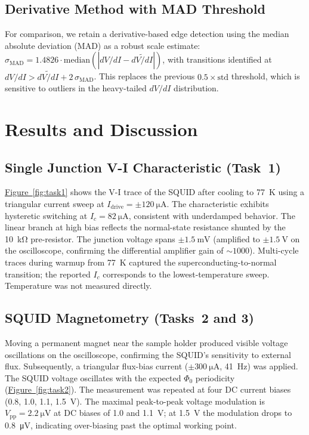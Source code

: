 \documentclass[12pt,a4paper]{article}
\begin{document}
\subsection{Derivative Method with MAD Threshold}

For comparison, we retain a derivative-based edge detection using the median absolute
deviation (MAD) as a robust scale estimate:
$\sigma_\mathrm{MAD} = 1.4826 \cdot \mathrm{median}(|dV/dI - \widetilde{dV/dI}|)$,
with transitions identified at $dV/dI > \widetilde{dV/dI} + 2\,\sigma_\mathrm{MAD}$.
This replaces the previous $0.5\times\mathrm{std}$ threshold, which is sensitive to
outliers in the heavy-tailed $dV/dI$ distribution.


\section{Results and Discussion}

\subsection{Single Junction V-I Characteristic (Task~1)}

\hyperref[fig:task1]{Figure~\ref*{fig:task1}} shows the V-I trace of the SQUID after
cooling to \SI{77}{\kelvin} using a triangular current sweep at
$I_\mathrm{drive} = \pm\SI{120}{\micro\ampere}$. The characteristic exhibits
hysteretic switching at $I_c = \SI{82}{\micro\ampere}$, consistent with underdamped
behavior. The linear branch at high bias reflects the normal-state resistance
shunted by the \SI{10}{\kilo\ohm} pre-resistor. The junction voltage spans
$\pm\SI{1.5}{\milli\volt}$ (amplified to $\pm\SI{1.5}{\volt}$ on the oscilloscope,
confirming the differential amplifier gain of $\sim\!1000$). Multi-cycle
traces during warmup from \SI{77}{\kelvin} captured the superconducting-to-normal
transition; the reported $I_c$ corresponds to the lowest-temperature sweep.
Temperature was not measured directly.

\subsection{SQUID Magnetometry (Tasks~2 and 3)}

Moving a permanent magnet near the sample holder produced visible voltage
oscillations on the oscilloscope, confirming the SQUID's sensitivity to external
flux. Subsequently, a triangular flux-bias current ($\pm\SI{300}{\micro\ampere}$,
\SI{41}{\hertz}) was applied. The SQUID voltage oscillates with the expected
$\Phi_0$ periodicity (\hyperref[fig:task2]{Figure~\ref*{fig:task2}}). The measurement
was repeated at four DC current biases (0.8, 1.0, 1.1, \SI{1.5}{\volt}). The
maximal peak-to-peak voltage modulation is
$V_\mathrm{pp} = \SI{2.2}{\micro\volt}$ at DC biases of 1.0 and \SI{1.1}{\volt};
at \SI{1.5}{\volt} the modulation drops to \SI{0.8}{\micro\volt}, indicating
over-biasing past the optimal working point.
\end{document}
